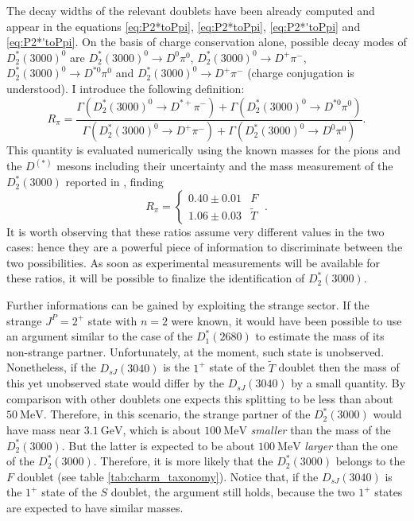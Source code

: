 The decay widths of the relevant doublets have been already computed and appear in the equations \eqref{eq:P2*toPpi}, \eqref{eq:P2*toPpi}, \eqref{eq:P2*'toPpi} and \eqref{eq:P2*'toPpi}. On the basis of charge conservation alone, possible decay modes of $D_2^*(3000)^0$ are $D^*_2(3000)^0 \to D^0 \pi^0$, $D^*_2(3000)^0 \to D^+ \pi^-$, $D^*_2(3000)^0 \to D^{* 0} \pi^0$ and $D^*_2(3000)^0 \to D^+ \pi^-$ (charge conjugation is understood). I introduce the following definition:
\begin{equation}
  R_\pi = \frac{\Gamma \left( D_2^*(3000)^0 \rightarrow D^{* +} \pi^- \right) + \Gamma \left( D_2^*(3000)^0 \rightarrow D^{* 0} \pi^0 \right)}{\Gamma \left( D_2^*(3000)^0 \rightarrow D^+ \pi^- \right) + \Gamma \left( D_2^*(3000)^0 \rightarrow D^0 \pi^0 \right)} .
  \label{eq:Rpi_formula}
\end{equation}
This quantity is evaluated numerically using the known masses for the pions and the $D^{(*)}$ mesons including their uncertainty and the mass measurement of the $D^*_2(3000)$ reported in \cite{Aaij:2016fma}, finding
\begin{equation}
  R_\pi =
    \begin{cases}
      0.40 \pm 0.01 & F \\
      1.06 \pm 0.03 & \tilde{T} 
    \end{cases} \ .
    \label{eq:Rpi_numeric}
\end{equation}
It is worth observing that these ratios assume very different values in the two cases: hence they are a powerful piece of information to discriminate between the two possibilities. As soon as experimental measurements will be available for these ratios, it will be possible to finalize the identification of $D_2^*(3000)$.

Further informations can be gained by exploiting the strange sector. If the strange $J^P = 2^+$ state with $n = 2$ were known, it would have been possible to use an argument similar to the case of the $D^*_1(2680)$ to estimate the mass of its non-strange partner. Unfortunately, at the moment, such state is unobserved. Nonetheless, if the $D_{s J}(3040)$ is the $1^+$ state of the $\tilde{T}$ doublet then the mass of this yet unobserved state would differ by the $D_{s J}(3040)$ by a small quantity. By comparison with other doublets one expects this splitting to be less than about $50 \ \text{MeV}$. Therefore, in this scenario, the strange partner of the $D^*_2(3000)$ would have mass near $3.1 \ \text{GeV}$, which is about $100 \ \text{MeV}$ \emph{smaller} than the mass of the $D^*_2(3000)$. But the latter is expected to be about $100 \ \text{MeV}$ \emph{larger} than the one of the $D^*_2(3000)$. Therefore, it is more likely that the $D^*_2(3000)$ belongs to the $F$ doublet (see table \ref{tab:charm_taxonomy}). Notice that, if the $D_{s J}(3040)$ is the $1^+$ state of the $S$ doublet, the argument still holds, because the two $1^+$ states are expected to have similar masses.

